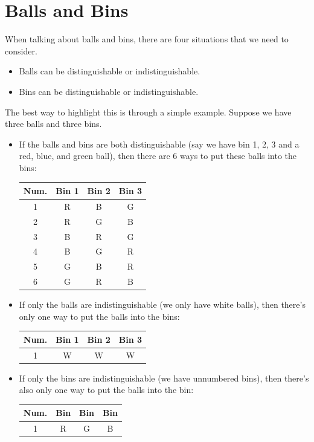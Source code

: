 \documentclass[letterpaper]{article}
\begin{document}
\section{Balls and Bins}
When talking about balls and bins, there are four situations that we need to consider.
\begin{itemize}
    \item Balls can be distinguishable or indistinguishable.
    \item Bins can be distinguishable or indistinguishable.
\end{itemize}
The best way to highlight this is through a simple example. Suppose we have three balls and three bins. 
\begin{itemize}
    \item If the balls and bins are both distinguishable (say we have bin 1, 2, 3 and a red, blue, and green ball), then there are 6 ways to put these balls into the bins:
    \begin{center}
        \begin{tabular}{c|c|c|c} 
            Num. & \textbf{Bin 1} & \textbf{Bin 2} & \textbf{Bin 3} \\ 
            \hline 
            1 & R & B & G \\ 
            2 & R & G & B \\ 
            3 & B & R & G \\ 
            4 & B & G & R \\ 
            5 & G & B & R \\ 
            6 & G & R & B
        \end{tabular}
    \end{center}

    \item If only the balls are indistinguishable (we only have white balls), then there's only one way to put the balls into the bins: 
    \begin{center}
        \begin{tabular}{c|c|c|c}
            Num. & \textbf{Bin 1} & \textbf{Bin 2} & \textbf{Bin 3} \\ 
            \hline
            1 & W & W & W
        \end{tabular}
    \end{center}

    \item If only the bins are indistinguishable (we have unnumbered bins), then there's also only one way to put the balls into the bin: 
    \begin{center}
        \begin{tabular}{c|c|c|c}
            Num. & \textbf{Bin} & \textbf{Bin} & \textbf{Bin} \\ 
            \hline
            1 & R & G & B
        \end{tabular}
    \end{center}    
\end{itemize}
\end{document}
